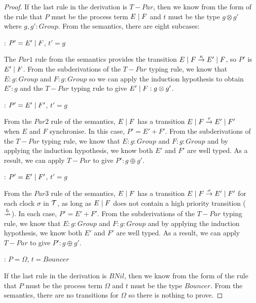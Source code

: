 \begin{proof}
\noindent If the last rule in the derivation is $T-Par$, then we know
from the form of the rule that $P$ must be the process term $E \;|\; F$
and $t$ must be the type $g \otimes g'$ where $g, g' : Group$.  From
the semantics, there are eight subcases:

: $P' = E' \;|\; F$, $t' = g$

\noindent The $Par1$ rule from the semantics provides the transition
$E \;|\; F \stackrel{\kappa}{\rightarrow} E' \;|\; F$, so $P'$ is $E' \;|\; F$.  From the
subderivations of the $T-Par$ typing rule, we know that $E : g : Group$
and $F : g : Group$ so we can apply the induction hypothesis to obtain
$E' : g$ and the $T-Par$ typing rule to give $E' \;|\; F : g \otimes g'$.

: $P' = E' \;|\; F'$, $t' = g$

\noindent From the $Par2$ rule of the semantics, $E \;|\; F$ has a
transition $E \;|\; F \stackrel{\tau}{\rightarrow} E' \;|\; F'$ when $E$ and $F$
synchronise.  In this case, $P' = E' + F'$.  From the subderivations
of the $T-Par$ typing rule, we know that $E : g : Group$ and $F : g :
Group$ and by applying the induction hypothesis, we know both $E'$ and
$F'$ are well typed.  As a result, we can apply $T-Par$ to give $P' : g
\oplus g'$.

: $P' = E' \;|\; F'$, $t' = g$

\noindent From the $Par3$ rule of the semantics, $E \;|\; F$ has a
transition $E \;|\; F \stackrel{\sigma}{\rightarrow} E' \;|\; F'$ for each clock
$\sigma$ in $\text{$\mathcal{T}$}$, as long as $E \;|\; F$ does not contain a high
priority transition ($\stackrel{h}{\nrightarrow}$).  In each case, $P' = E' + F'$.
From the subderivations of the $T-Par$ typing rule, we know that $E : g
: Group$ and $F : g : Group$ and by applying the induction hypothesis,
we know both $E'$ and $F'$ are well typed.  As a result, we can apply
$T-Par$ to give $P' : g \oplus g'$.

: $P = \Omega$, $t = Bouncer$

\noindent If the last rule in the derivation is $BNil$, then we know
from the form of the rule that $P$ must be the process term $\Omega$
and $t$ must be the type $Bouncer$.  From the semantics, there are no
transitions for $\Omega$ so there is nothing to prove.

\end{proof}

